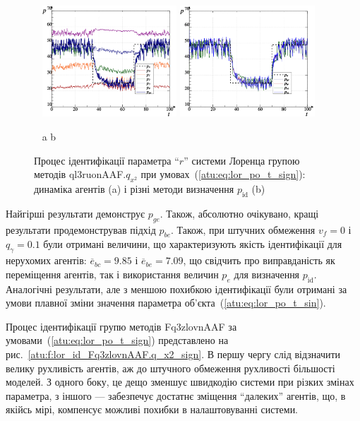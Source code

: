\documentclass[a4paper,13pt]{atuaref}
\begin{document}
\begin{figure}[ht!]
  \centerline{
    ~ \hfill
    \includegraphics[width=0.45\textwidth]{p5/p/cha/lor/ql3ruonAAF/lor_ql3ruonAAF_qy2-p_t_pi_sign_xl.png}
    \hfill
    \includegraphics[width=0.45\textwidth]{p5/p/cha/lor/ql3ruonAAF/lor_ql3ruonAAF_qy2-p_t_pz_sign_xl.png}
    \hfill ~
  }
  \vspace{-1.5ex}
  \begin{center}
    ~ \hfill a \hfill\hfill b  \hfill ~
  \end{center}
  \vspace{-2.5ex}
  \caption{Процес ідентифікації параметра ``$r$'' системи Лоренца групою методів ql3ruonAAF.$q_{x^2}$ при умовах~(\ref{atu:eq:lor_po_t_sign}):
  динаміка агентів (a) і різні методи визначення $p_\mathrm{id}$ (b)}
  \label{atu:f:lor_id_ql3ruonAAF.q_x2_sign}
\end{figure}

Найгірші результати демонструє $p_{ge}$. Також, абсолютно очікувано, кращі
результати продемонстрував підхід $ p_{be}$. Також, при штучних обмеження
$v_f = 0$ і $q_\gamma = 0.1$ були отримані величини, що характеризують
якість ідентифікації для нерухомих агентів:
$\overline{e}_{bc} = 9.85$ і
$\overline{e}_{be} = 7.09$, що свідчить про виправданість як переміщення
агентів, так і використання величин $p_e$ для визначення $p_\mathrm{id}$.
Аналогічні результати, але з меншою похибкою ідентифікації були отримані за
умови плавної зміни значення параметра об'єкта~(\ref{atu:eq:lor_po_t_sin}).

Процес ідентифікації групю методів Fq3zlovnAAF за умовами~(\ref{atu:eq:lor_po_t_sign}) представлено
на рис.~\ref{atu:f:lor_id_Fq3zlovnAAF.q_x2_sign}. В першу чергу слід
відзначити велику рухливість агентів, аж до штучного обмеження рухливості
більшості моделей. З одного боку, це дещо зменшує швидкодію системи при
різких змінах параметра, з іншого --- забезпечує достатнє зміщення ``далеких''
агентів, що, в якійсь мірі, компенсує можливі похибки в налаштовуванні системи.
\end{document}
